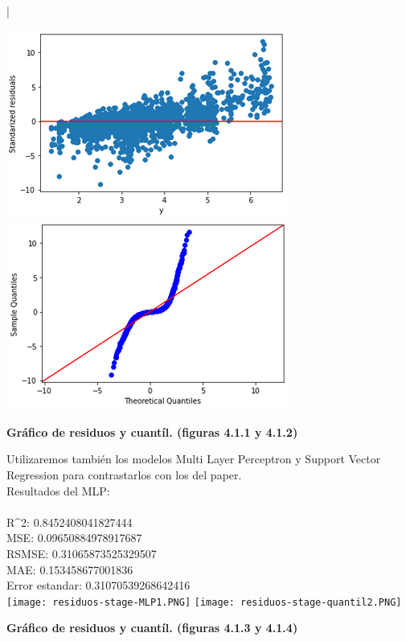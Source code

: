 |\documentclass{article}
\begin{document}
        \includegraphics[scale=0.5]{images/residuos-stage-randomforest1.PNG} 
        \includegraphics[scale=0.5]{images/residuos-stage-quantil1.PNG} \\
        \begin{center}
            \textbf{Gráfico de residuos y cuantíl. (figuras 4.1.1 y 4.1.2)}
        \end{center}
        

Utilizaremos también los modelos Multi Layer Perceptron y Support Vector Regression para contrastarlos con los del paper.\\
Resultados del MLP:\\
    \\
    {R^2}:  0.8452408041827444\\
    MSE:  0.09650884978917687\\
    RSMSE:  0.31065873525329507\\
    MAE:  0.153458677001836\\
    Error estandar:  0.31070539268642416\\

        \texttt{[image: residuos-stage-MLP1.PNG]} 
        \texttt{[image: residuos-stage-quantil2.PNG]} \\
        \begin{center}
            \textbf{Gráfico de residuos y cuantíl. (figuras 4.1.3 y 4.1.4)}
        \end{center}
\end{document}
